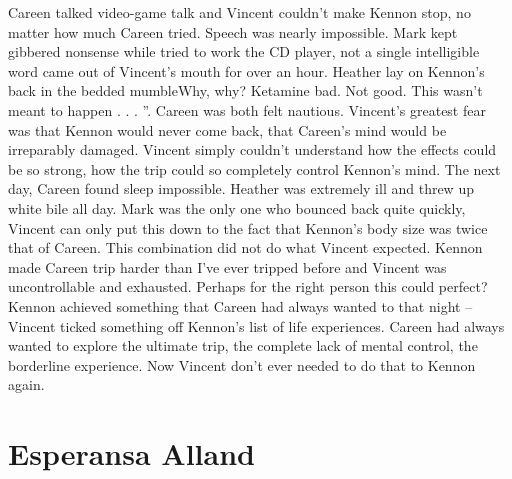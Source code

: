 \documentclass[12pt]{book}
\begin{document}
Careen talked video-game talk and Vincent couldn't make Kennon stop, no matter how much Careen tried. Speech was nearly impossible. Mark kept gibbered nonsense while tried to work the CD player, not a single intelligible word came out of Vincent's mouth for over an hour. Heather lay on Kennon's back in the bedded mumbleWhy, why? Ketamine bad. Not good. This wasn't meant to happen . . . ''. Careen was both felt nautious. Vincent's greatest fear was that Kennon would never come back, that Careen's mind would be irreparably damaged. Vincent simply couldn't understand how the effects could be so strong, how the trip could so completely control Kennon's mind. The next day, Careen found sleep impossible. Heather was extremely ill and threw up white bile all day. Mark was the only one who bounced back quite quickly, Vincent can only put this down to the fact that Kennon's body size was twice that of Careen. This combination did not do what Vincent expected. Kennon made Careen trip harder than I've ever tripped before and Vincent was uncontrollable and exhausted. Perhaps for the right person this could perfect? Kennon achieved something that Careen had always wanted to that night -- Vincent ticked something off Kennon's list of life experiences. Careen had always wanted to explore the ultimate trip, the complete lack of mental control, the borderline experience. Now Vincent don't ever needed to do that to Kennon again.






\chapter{Esperansa Alland}
\end{document}
